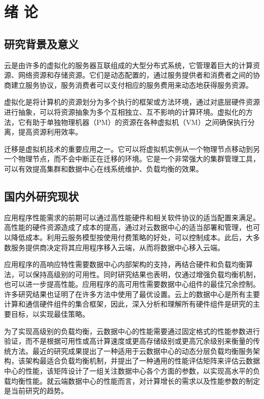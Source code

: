 \chapter{绪 论}

\section{研究背景及意义}
云是由许多的虚拟化的服务器互联组成的大型分布式系统，它管理着巨大的计算资源、网络资源和存储资源。它们是动态配置的，通过服务提供者和消费者之间的协商建立服务协议，服务消费者可以支付相应的服务费用来动态地获得服务资源\cite{Net,Net1}。

虚拟化是将计算机的资源划分为多个执行的框架或方法环境，通过对底层硬件资源进行抽象，可以将资源抽象为多个互相独立、互不影响的计算环境。虚拟化的方法，它有助于单独物理机器（PM）的资源在各种虚拟机（VM）之间确保执行分离，提高资源利用效率。

迁移是虚拟机技术的重要应用之一。它可以将虚拟机实例从一个物理节点移动到另一个物理节点，而不会中断正在迁移的环境。它是一个非常强大的集群管理工具，可以有效提高集群和数据中心在线系统维护、负载均衡的效果。

\section{国内外研究现状}
应用程序性能需求的前期可以通过高性能硬件和相关软件协议的适当配置来满足。高性能的硬件资源造成了成本的提高，通过对云数据中心的适当部署和管理，也可以降低成本。利用云服务模型按使用付费策略的好处，可以控制成本。此后，大多数服务提供商决定将其应用程序移入云端，从而将数据中心移入云端。

应用程序的高响应特性需要数据中心内部架构的支持，再结合硬件和负载均衡算法，可以保持高级别的可用性。同时研究结果也表明，仅通过增强负载均衡机制，也可以进一步提高性能\cite{Xiang,Yan}。应用程序的高可用性需要数据中心组件的最佳冗余控制。许多研究结果也证明了在许多方法中使用了最优设置\cite{Gang,Beloglazov}。云上的数据中心是所有主要计算和通信硬件组件的集合框架，因此，深入分析和理解所有硬件组件是研究的主要目标，以实现最佳策略。

为了实现高级别的负载均衡，云数据中心的性能需要通过固定格式的性能参数进行验证，而不是根据可用性或高计算速度或更高存储级别或更高冗余级别来衡量的传统方法。最近的研究成果提出了一种适用于云数据中心的动态分层负载均衡服务架构，该架构最适合负载均衡机制，并提出了一种通用的性能评估矩阵来评估云数据中心的性能，该矩阵设计了一组关注数据中心各个方面的参数，以实现高水平的负载均衡性能\cite{Kothapuli}。就云端数据中心的性能而言，对计算增长的需求以及性能参数的制定是当前研究的趋势。

